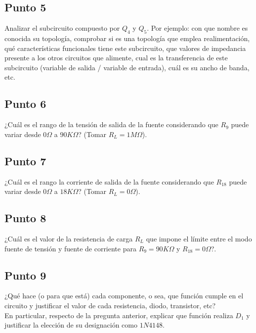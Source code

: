 \clearpage

\subsection{Punto 5}

Analizar el subcircuito compuesto por $Q_{4}$ y $Q_{5}$. Por ejemplo: con que nombre es conocida su topología, comprobar si es una topología que emplea realimentación, qué características funcionales tiene este subcircuito, que valores de impedancia presente a los otros circuitos que alimente, cual es la transferencia de este subcircuito (variable de salida / variable de entrada), cuál es su ancho de banda, etc.

\clearpage

\subsection{Punto 6}

¿Cuál es el rango de la tensión de salida de la fuente considerando que $R_{9}$ puede variar desde $0 \Omega$ a $90 K\Omega$? (Tomar $R_{L} = 1M\Omega$).

\clearpage

\subsection{Punto 7}

¿Cuál es el rango la corriente de salida de la fuente considerando que $R_{18}$ puede variar desde $0 \Omega$ a $18 K\Omega$? (Tomar $R_{L} = 0\Omega$).

\clearpage

\subsection{Punto 8}

¿Cuál es el valor de la resistencia de carga $R_{L}$ que impone el límite entre el modo fuente de tensión y fuente de corriente para $R_{9} = 90 K\Omega$ y $R_{18} = 0 \Omega$?.

\clearpage

\subsection{Punto 9}

¿Qué hace (o para que está) cada componente, o sea, que función cumple en el circuito y justificar el valor de cada resistencia, diodo, transistor, etc?\\
En particular, respecto de la pregunta anterior, explicar que función realiza $D_{1}$ y justificar la elección de su designación como $1N4148$.

